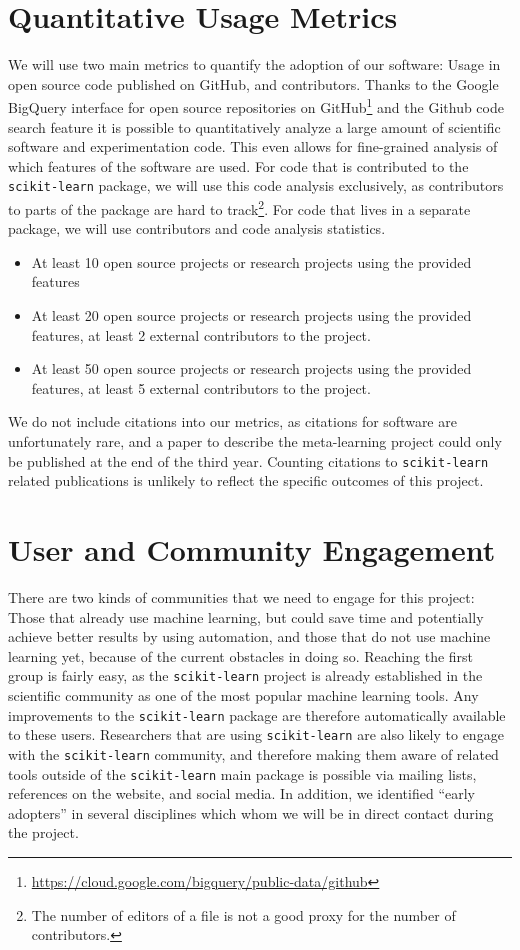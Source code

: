 \documentclass[11pt,letterpaper]{article}
\newcommand{\sklearn}[0]{\texttt{scikit-learn}\xspace}                    %
\begin{document}
\section{Quantitative Usage Metrics}
We will use two main metrics to quantify the adoption of our software:
Usage in open source code published on GitHub, and contributors.
Thanks to the Google BigQuery interface for open source repositories on GitHub\footnote{\url{https://cloud.google.com/bigquery/public-data/github}} and
the Github code search feature it is possible to quantitatively analyze a large
amount of scientific software and experimentation code. This even allows for
fine-grained analysis of which features of the software are used.
For code that is contributed to the \sklearn package, we will use this code
analysis exclusively, as contributors to parts of the package are hard to
track\footnote{The number of editors of a file is not a good proxy for the
number of contributors.}. For code that lives in a separate package, we will use
contributors and code analysis statistics.

\begin{itemize}
\item[Year 1] At least 10 open source projects or research projects using the provided features
\item[Year 2] At least 20 open source projects or research projects using the
provided features, at least 2 external contributors to the project.
\item[Year 3] At least 50 open source projects or research projects using the
provided features, at least 5 external contributors to the project.
\end{itemize}
\vspace{10pt}
We do not include citations into our metrics, as citations for software are
unfortunately rare, and a paper to describe the meta-learning project
could only be published at the end of the third year. Counting
citations to \sklearn related publications is unlikely to reflect
the specific outcomes of this project.

\enlargethispage{15pt}
\section{User and Community Engagement}
There are two kinds of communities that we need to engage for this project:
Those that already use machine learning, but could save time and potentially achieve
better results by using automation, and those that do not use machine learning yet,
because of the current obstacles in doing so.
Reaching the first group is fairly easy, as the \sklearn project is already established
in the scientific community as one of the most popular machine learning tools. Any
improvements to the \sklearn package are therefore automatically available to these
users. Researchers that are using \sklearn are also likely to engage with the \sklearn
community, and therefore making them aware of related tools outside of the \sklearn main
package is possible via mailing lists, references on the website, and social media.
In addition, we identified ``early adopters'' in several disciplines which whom we will
be in direct contact during the project.
\end{document}
